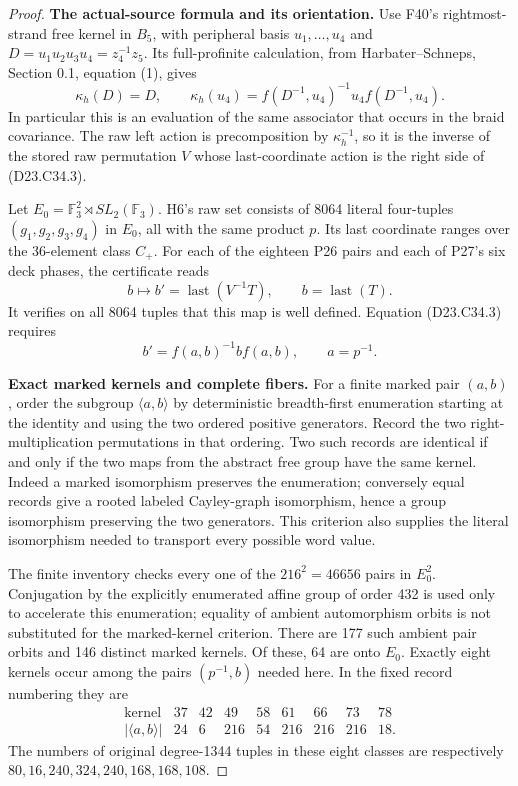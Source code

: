 \begin{proof}
\textbf{The actual-source formula and its orientation.}\quad
Use F40's rightmost-strand free kernel in $B_5$, with
peripheral basis $u_1,\ldots,u_4$ and
$D=u_1u_2u_3u_4=z_4^{-1}z_5$.
Its full-profinite calculation, from
Harbater--Schneps, Section 0.1, equation (1), gives
\[
 \kappa_h(D)=D,\qquad
 \kappa_h(u_4)=f(D^{-1},u_4)^{-1}u_4f(D^{-1},u_4).
                                                               \tag{D23.C34.3}
\]
In particular this is an evaluation of the same
associator that occurs in the braid covariance.
The raw left action is precomposition by
$\kappa_h^{-1}$, so it is the inverse of the stored
raw permutation $V$ whose last-coordinate action
is the right side of (D23.C34.3).

Let $E_0=\mathbb F_3^2\rtimes SL_2(\mathbb F_3)$.
H6's raw set consists of 8064 literal four-tuples
$(g_1,g_2,g_3,g_4)$ in $E_0$, all with the same
product $p$.  Its last coordinate ranges over the
36-element class $C_+$.  For each of the eighteen
P26 pairs and each of P27's six deck phases, the
certificate reads
\[
   b\longmapsto b'=\operatorname{last}(V^{-1}T),
                 \qquad b=\operatorname{last}(T).
\]
It verifies on all 8064 tuples that this map is
well defined.  Equation (D23.C34.3) requires
\[
                b'=f(a,b)^{-1}bf(a,b),\qquad a=p^{-1}.
                                                               \tag{D23.C34.4}
\]

\textbf{Exact marked kernels and complete fibers.}\quad
For a finite marked pair $(a,b)$, order the subgroup
$\langle a,b\rangle$ by deterministic breadth-first
enumeration starting at the identity and using the
two ordered positive generators.  Record the two
right-multiplication permutations in that ordering.
Two such records are identical if and only if the
two maps from the abstract free group have the
same kernel.  Indeed a marked isomorphism preserves
the enumeration; conversely equal records give a
rooted labeled Cayley-graph isomorphism, hence a
group isomorphism preserving the two generators.
This criterion also supplies the literal isomorphism
needed to transport every possible word value.

The finite inventory checks every one of the
$216^2=46656$ pairs in $E_0^2$.
Conjugation by the explicitly enumerated affine
group of order 432 is used only to accelerate
this enumeration; equality of ambient automorphism
orbits is not substituted for the marked-kernel
criterion.  There are 177 such ambient pair orbits
and 146 distinct marked kernels.  Of these, 64
are onto $E_0$.  Exactly eight kernels occur among
the pairs $(p^{-1},b)$ needed here.  In the fixed
record numbering they are
\[
\begin{array}{c|rrrrrrrr}
\text{kernel}&37&42&49&58&61&66&73&78\\ \hline
|\langle a,b\rangle|&24&6&216&54&216&216&216&18 .
\end{array}                                                \tag{D23.C34.5}
\]
The numbers of original degree-1344 tuples in
these eight classes are respectively
$80,16,240,324,240,168,168,108$.


\end{proof}
